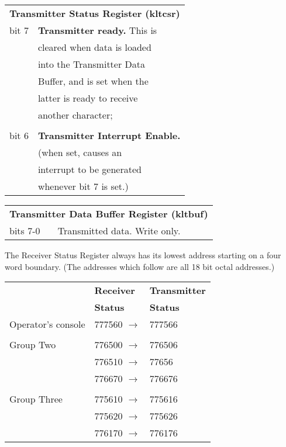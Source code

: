 \noindent\begin{tabular}{ll}\\
\multicolumn{2}{l}{\bf Transmitter Status Register (kltcsr)} \\
bit 7 & {\bf Transmitter ready.} This is\\
      & cleared when data is loaded\\
      & into the Transmitter Data\\
      & Buffer, and is set when the\\
      & latter is ready to receive\\
      & another character;\\
\\
bit 6 & {\bf Transmitter Interrupt Enable.}\\
     & (when set, causes an\\
     & interrupt to be generated\\
     & whenever bit 7 is set.)\\
\end{tabular}

\noindent\begin{tabular}{ll}\\
\multicolumn{2}{l}{\bf Transmitter Data Buffer Register (kltbuf)} \\
bits 7-0 & Transmitted data. Write only.\\
\end{tabular}


The Receiver Status Register always has
its lowest address starting on a four
word boundary. (The addresses which
follow are all 18 bit octal addresses.)

\noindent\begin{tabular}{lll}\\
 & {\bf Receiver} & {\bf Transmitter}\\
 & {\bf Status} & {\bf Status}\\
Operator's console & 777560 $\rightarrow$ & 777566\\
\\
Group Two & 776500 $\rightarrow$ & 776506\\
	& 776510 $\rightarrow$ & 77656 \\ \cline{2-3}
	& 776670 $\rightarrow$ & 776676\\
\\
Group Three & 775610 $\rightarrow$ & 775616\\
        & 775620 $\rightarrow$ & 775626 \\ \cline{2-3}
        & 776170 $\rightarrow$ & 776176\\
\end{tabular}

